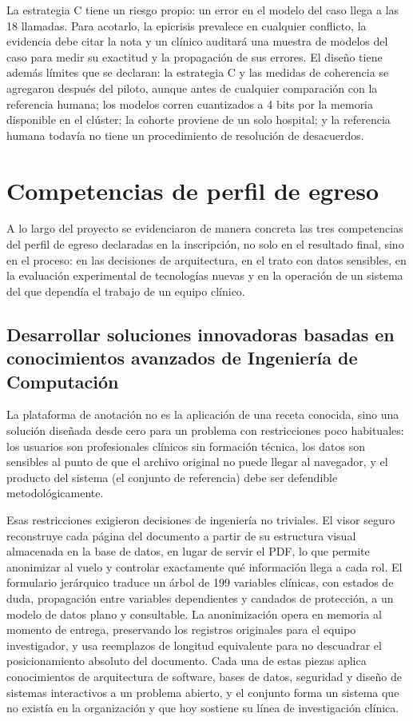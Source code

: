 \documentclass[12pt,letterpaper]{article}
\begin{document}
La estrategia C tiene un riesgo propio: un error en el modelo del caso llega a las 18 llamadas. Para acotarlo, la epicrisis prevalece en cualquier conflicto, la evidencia debe citar la nota y un clínico auditará una muestra de modelos del caso para medir su exactitud y la propagación de sus errores. El diseño tiene además límites que se declaran: la estrategia C y las medidas de coherencia se agregaron después del piloto, aunque antes de cualquier comparación con la referencia humana; los modelos corren cuantizados a 4 bits por la memoria disponible en el clúster; la cohorte proviene de un solo hospital; y la referencia humana todavía no tiene un procedimiento de resolución de desacuerdos.

\section{Competencias de perfil de egreso}

A lo largo del proyecto se evidenciaron de manera concreta las tres competencias del perfil de egreso declaradas en la inscripción, no solo en el resultado final, sino en el proceso: en las decisiones de arquitectura, en el trato con datos sensibles, en la evaluación experimental de tecnologías nuevas y en la operación de un sistema del que dependía el trabajo de un equipo clínico.

\subsection*{Desarrollar soluciones innovadoras basadas en conocimientos avanzados de Ingeniería de Computación}

La plataforma de anotación no es la aplicación de una receta conocida, sino una solución diseñada desde cero para un problema con restricciones poco habituales: los usuarios son profesionales clínicos sin formación técnica, los datos son sensibles al punto de que el archivo original no puede llegar al navegador, y el producto del sistema (el conjunto de referencia) debe ser defendible metodológicamente.

Esas restricciones exigieron decisiones de ingeniería no triviales. El visor seguro reconstruye cada página del documento a partir de su estructura visual almacenada en la base de datos, en lugar de servir el PDF, lo que permite anonimizar al vuelo y controlar exactamente qué información llega a cada rol. El formulario jerárquico traduce un árbol de 199 variables clínicas, con estados de duda, propagación entre variables dependientes y candados de protección, a un modelo de datos plano y consultable. La anonimización opera en memoria al momento de entrega, preservando los registros originales para el equipo investigador, y usa reemplazos de longitud equivalente para no descuadrar el posicionamiento absoluto del documento. Cada una de estas piezas aplica conocimientos de arquitectura de software, bases de datos, seguridad y diseño de sistemas interactivos a un problema abierto, y el conjunto forma un sistema que no existía en la organización y que hoy sostiene su línea de investigación clínica.
\end{document}
